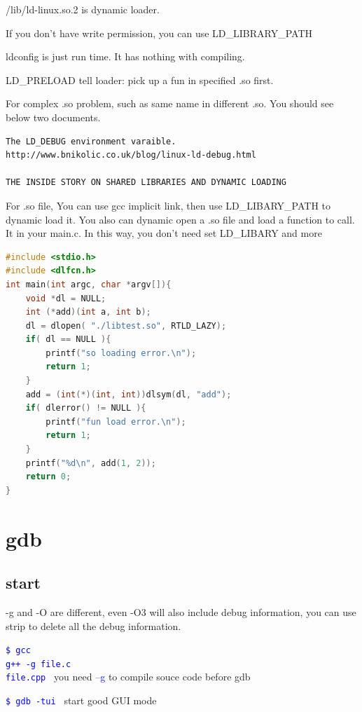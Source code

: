 \documentclass[paper=8.5in:11in, twoside, 12pt, pagesize=pdftex]{book}
\newcommand{\linuxcommand}[1]{\texttt{\textcolor{blue}{\$ #1 \Pisymbol{psy}{191}}}}
\newcommand{\op}[1]{\textcolor{blue}{-#1}}
\begin{document}
	/lib/ld-linux.so.2 is dynamic loader. 

	If you don't have write permission, you can use LD\_LIBRARY\_PATH

	ldconfig is just run time. It has nothing with compiling. 

	LD\_PRELOAD tell loader: pick up a fun in specified .so first. 

	For complex .so problem, such as same name in different .so.  You should see below two documents. 

\begin{lstlisting}
The LD_DEBUG environment varaible.
http://www.bnikolic.co.uk/blog/linux-ld-debug.html	

THE INSIDE STORY ON SHARED LIBRARIES AND DYNAMIC LOADING			
\end{lstlisting}			
  	 
	For .so file, You can use gcc implicit link, then use LD\_LIBARY\_PATH to dynamic load it. You also can dynamic open a .so file and load a function to call. It in your main.c. In this way, you don't need set LD\_LIBARY and more 

\begin{lstlisting}[frame=single, language=c++]
#include <stdio.h>
#include <dlfcn.h>
int main(int argc, char *argv[]){
	void *dl = NULL;
	int (*add)(int a, int b);
	dl = dlopen( "./libtest.so", RTLD_LAZY);
	if( dl == NULL ){
		printf("so loading error.\n");
		return 1;
	}
    add = (int(*)(int, int))dlsym(dl, "add");
	if( dlerror() != NULL ){
        printf("fun load error.\n");
		return 1;
	}
	printf("%d\n", add(1, 2));
	return 0;
}
\end{lstlisting}

\section{gdb}
\subsection{start}

-g and -O are different, even -O3 will also include debug information, you can use strip to delete all the debug information. 

\linuxcommand{gcc\\g++ -g file.c\\file.cpp} you need \op{-g} to compile souce code before gdb

  \linuxcommand{gdb -tui} start good GUI mode
\end{document}
